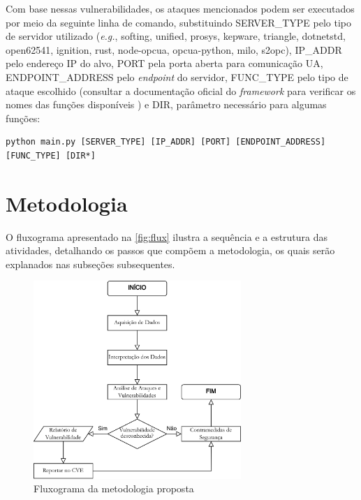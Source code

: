         Com base nessas vulnerabilidades, os ataques mencionados podem ser executados por meio da seguinte linha de comando, substituindo SERVER\_TYPE pelo tipo de servidor utilizado (\textit{e.g.}, softing, unified, prosys, kepware, triangle, dotnetstd, open62541, ignition, rust, node-opcua, opcua-python, milo, s2opc), IP\_ADDR pelo endereço IP do alvo, PORT pela porta aberta para comunicação UA, ENDPOINT\_ADDRESS pelo \textit{endpoint} do servidor, FUNC\_TYPE pelo tipo de ataque escolhido (consultar a documentação oficial do \textit{framework} para verificar os nomes das funções disponíveis \cite{claroty2023}) e DIR, parâmetro necessário para algumas funções:

        \begin{verbatim}
python main.py [SERVER_TYPE] [IP_ADDR] [PORT] [ENDPOINT_ADDRESS] [FUNC_TYPE] [DIR*]
        \end{verbatim}

\section{Metodologia}

    O fluxograma apresentado na \autoref{fig:flux} ilustra a sequência e a estrutura das atividades, detalhando os passos que compõem a metodologia, os quais serão explanados nas subseções subsequentes.
    
    \begin{figure}[htbp!]
        \caption{\label{fig:flux}Fluxograma da metodologia proposta}
        \begin{center}
            \includegraphics[width=0.7\textwidth]{USPSC-img/fluxograma.png}
        \end{center}
    \end{figure}

